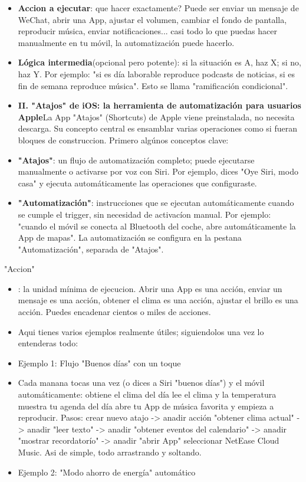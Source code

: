 \begin{itemize}
  \item \textbf{Accion a ejecutar}: que hacer exactamente? Puede ser enviar un mensaje de WeChat, abrir una App, ajustar el volumen, cambiar el fondo de pantalla, reproducir música, enviar notificaciones... casi todo lo que puedas hacer manualmente en tu móvil, la automatización puede hacerlo.
  \item \textbf{Lógica intermedia}(opcional pero potente): si la situación es A, haz X; si no, haz Y. Por ejemplo: "si es día laborable reproduce podcasts de noticias, si es fin de semana reproduce música". Esto se llama "ramificación condicional".
  \item \textbf{II. "Atajos" de iOS: la herramienta de automatización para usuarios Apple}La App "Atajos" (Shortcuts) de Apple viene preinstalada, no necesita descarga. Su concepto central es ensamblar varias operaciones como si fueran bloques de construccion. Primero algúnos conceptos clave:
  \item \textbf{"Atajos"}: un flujo de automatización completo; puede ejecutarse manualmente o activarse por voz con Siri. Por ejemplo, dices "Oye Siri, modo casa" y ejecuta automáticamente las operaciones que configuraste.
  \item \textbf{"Automatización"}: instrucciones que se ejecutan automáticamente cuando se cumple el trigger, sin necesidad de activacíon manual. Por ejemplo: "cuando el móvil se conecta al Bluetooth del coche, abre automáticamente la App de mapas". La automatización se configura en la pestana "Automatización", separada de "Atajos".
\end{itemize}

\begin{tcbinfo}{"Accion"}
\begin{itemize}
  \item : la unidad mínima de ejecucion. Abrir una App es una acción, enviar un mensaje es una acción, obtener el clima es una acción, ajustar el brillo es una acción. Puedes encadenar cientos o miles de acciones.
  \item Aqui tienes varios ejemplos realmente útiles; siguiendolos una vez lo entenderas todo:
  \item Ejemplo 1: Flujo "Buenos días" con un toque
  \item Cada manana tocas una vez (o dices a Siri "buenos días") y el móvil automáticamente: obtiene el clima del día lee el clima y la temperatura muestra tu agenda del día abre tu App de música favorita y empieza a reproducir. Pasos: crear nuevo atajo -> anadir acción "obtener clima actual" -> anadir "leer texto" -> anadir "obtener eventos del calendario" -> anadir "mostrar recordatorío" -> anadir "abrir App" seleccionar NetEase Cloud Music. Asi de simple, todo arrastrando y soltando.
  \item Ejemplo 2: "Modo ahorro de energía" automático
\end{itemize}

\end{tcbinfo}


